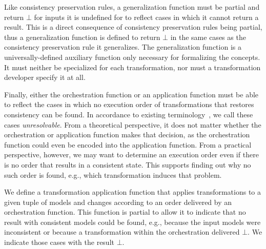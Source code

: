 Like consistency preservation rules, a generalization function must be partial and return $\bot$ for inputs it is undefined for to reflect cases in which it cannot return a result.
This is a direct consequence of consistency preservation rules being partial, thus a generalization function is defined to return $\bot$ in the same cases as the consistency preservation rule it generalizes.
%
The generalization function is a universally-defined auxiliary function only necessary for formalizing the concepts.
It must neither be specialized for each transformation, nor must a transformation developer specify it at all.

Finally, either the orchestration function or an application function must be able to reflect the cases in which no execution order of transformations that restores consistency can be found.
In accordance to existing terminology~\cite{stevens2020BidirectionalTransformationLarge-SoSym}, we call these cases \emph{unresolvable}.
From a theoretical perspective, it does not matter whether the orchestration or application function makes that decision, as the orchestration function could even be encoded into the application function.
From a practical perspective, however, we may want to determine an execution order even if there is no order that results in a consistent state.
This supports finding out why no such order is found, e.g., which transformation induces that problem.

We define a transformation application function that applies transformations to a given tuple of models and changes according to an order delivered by an orchestration function.
This function is partial to allow it to indicate that no result with consistent models could be found, e.g., because the input models were inconsistent or because a transformation within the orchestration delivered $\bot$.
We indicate those cases with the result $\bot$.

